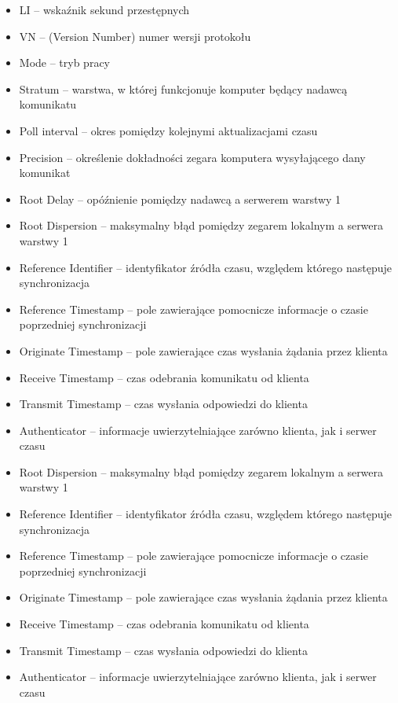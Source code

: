 \documentclass[../main.tex]{subfiles}
\begin{document}
\begin{itemize}
  \item LI – wskaźnik sekund przestępnych
  \item VN – (Version Number) numer wersji protokołu
  \item Mode – tryb pracy
  \item Stratum – warstwa, w której funkcjonuje komputer będący nadawcą komunikatu
  \item Poll interval – okres pomiędzy kolejnymi aktualizacjami czasu
  \item Precision – określenie dokładności zegara komputera wysyłającego dany komunikat
  \item Root Delay – opóźnienie pomiędzy nadawcą a serwerem warstwy 1
  \item Root Dispersion – maksymalny błąd pomiędzy zegarem lokalnym a serwera warstwy 1
  \item Reference Identifier – identyfikator źródła czasu, względem którego następuje synchronizacja
  \item Reference Timestamp – pole zawierające pomocnicze informacje o czasie poprzedniej synchronizacji
  \item Originate Timestamp – pole zawierające czas wysłania żądania przez klienta
  \item Receive Timestamp – czas odebrania komunikatu od klienta
  \item Transmit Timestamp – czas wysłania odpowiedzi do klienta
  \item Authenticator – informacje uwierzytelniające zarówno klienta, jak i serwer czasu
  \item Root Dispersion – maksymalny błąd pomiędzy zegarem lokalnym a serwera warstwy 1
  \item Reference Identifier – identyfikator źródła czasu, względem którego następuje synchronizacja
  \item Reference Timestamp – pole zawierające pomocnicze informacje o czasie poprzedniej synchronizacji
  \item Originate Timestamp – pole zawierające czas wysłania żądania przez klienta
  \item Receive Timestamp – czas odebrania komunikatu od klienta
  \item Transmit Timestamp – czas wysłania odpowiedzi do klienta
  \item Authenticator – informacje uwierzytelniające zarówno klienta, jak i serwer czasu
\end{itemize}
\end{document}
